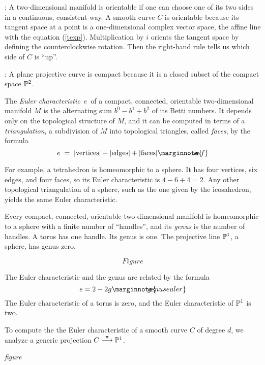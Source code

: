 \documentclass[leqno]{book}
\newcommand\Marginnote[1]{\marginnote{\hspace{-12pt}\normalfont{#1}}}
\theoremstyle{definition}%
\numberwithin{equation}{section}
\theoremstyle{theorem} %
\begin{document}
: A two-dimensional manifold is orientable if
one can choose one of its two sides in a continuous, consistent way.
A smooth curve $C$ is orientable because its tangent space at a point
is a one-dimensional complex vector space, the affine line with the
equation (\ref{texp}).  Multiplication by $i$ orients the tangent
space by defining the counterclockwise rotation.  Then the right-hand
rule tells us which side of $C$ is ``up''.
 
: A plane projective curve is  compact because
it is a  closed subset of the compact space $\mathbb{P}^2$.

\ms The {\it Euler characteristic} $\,e\,$ of a   compact, connected,
orientable two-dimensional manifold $M$ is the alternating sum
$b^0-b^1+b^2$ of its Betti numbers.  It depends
only on the topological structure of $M$, and it can be computed in terms of
a {\it triangulation}, a subdivision of $M$ into topological
triangles, called {\it faces}, by the formula
\begin{equation}
 e \;=\;|{\text{vertices}}| - |{\text{edges}}| + |{\text{faces}}|
 \Marginnote{vef}
 	\label{vef}
\end{equation}

\no
For example, a tetrahedron is homeomorphic to a sphere.
It  has four vertices, six edges, and four
faces, so its Euler characteristic is $4-6+4 = 2$.
Any other topological triangulation of a sphere, such as
the one given by the icosahedron, yields the same Euler
characteristic.

\ms Every  compact, {connected}, orientable two-dimensional
manifold is homeomorphic to a sphere with a finite number of
``handles'', and its {\it genus} is the number of handles.  
A torus has one handle. Its  genus is one.  The
projective line $\mathbb{P}^1$, a sphere, has genus zero.  

$$Figure$$

The Euler
characteristic and the genus are related by the formula
\begin{equation}
e = 2-2g \Marginnote{genuseuler}
	\label{genuseuler}
\end{equation}
 The Euler characteristic of a torus is zero, and the Euler
 characteristic of $\mathbb{P}^1$ is two.

\ms To compute the the Euler characteristic  of a smooth curve $C$
of degree $d$, we analyze a generic projection $C
\stackrel{\pi}\longrightarrow \mathbb{P}^1$.

\bs
\centerline{\it figure}
\bs
\end{document}
